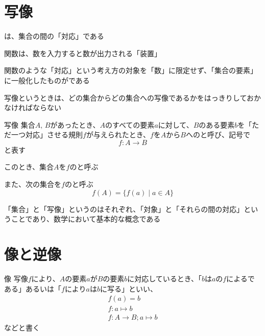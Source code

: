 \documentclass[../../../topic_mapping]{subfiles}
\begin{document}
\sectionline
\section{写像}

は、集合の間の「対応」である

\br

関数は、数を入力すると数が出力される「装置」

関数のような「対応」という考え方の対象を「数」に限定せず、「集合の要素」に一般化したものがである

\br

写像というときは、どの集合からどの集合への写像であるかをはっきりしておかなければならない

\begin{definition}{写像}
  集合$A, \, B$があったとき、$A$のすべての要素$a$に対して、$B$のある要素$b$を「ただ一つ対応」させる規則$f$が与えられたとき、$f$を$A$から$B$へのと呼び、記号で
  \begin{equation*}
    f\colon A \to B
  \end{equation*}
  と表す

  このとき、集合$A$を$f$のと呼ぶ

  また、次の集合を$f$のと呼ぶ
  \begin{equation*}
    f(A) = \{ f(a) \mid a \in A \}
  \end{equation*}
\end{definition}

「集合」と「写像」というのはそれぞれ、「対象」と「それらの間の対応」ということであり、数学において基本的な概念である

\sectionline
\section{像と逆像}

\begin{definition}{像}
  写像$f$により、$A$の要素$a$が$B$の要素$b$に対応しているとき、「$b$は$a$の$f$によるである」あるいは「$f$により$a$は$b$に写る」といい、
  \begin{gather*}
    f(a) = b \\
    f: a \mapsto b \\
    f: A \to B; a \mapsto b
  \end{gather*}
  などと書く
\end{definition}
\end{document}
